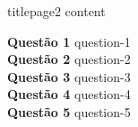 \documentclass[a4paper, 12pt]{article}
\begin{document}
	{titlepage2}
	\newpage
    {content}  
    
   	\noindent\textbf{Questão 1}
   	{question-1}\\
   	\noindent\textbf{Questão 2}
   	{question-2}\\
   	\noindent\textbf{Questão 3}
   	{question-3}\\
   	\noindent\textbf{Questão 4}
   	{question-4}\\
	\noindent\textbf{Questão 5}
   	{question-5}
  
\end{document}
